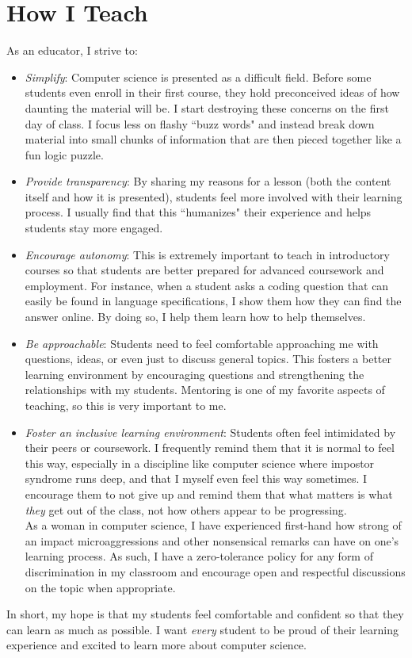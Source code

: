 \documentclass[12pt]{amsart} \usepackage{amssymb}
\begin{document}
\section*{How I Teach}
\noindent As an educator, I strive to:
\begin{itemize}
\item \emph{Simplify}: Computer science is presented as a difficult field. Before some students even enroll in their first course, they hold preconceived ideas of how daunting the material will be. I start destroying these concerns on the first day of class. I focus less on flashy ``buzz words" and instead break down material into small chunks of information that are then pieced together like a fun logic puzzle.
\vspace{2mm}
\item \emph{Provide transparency}: By sharing my reasons for a lesson (both the content itself and how it is presented), students feel more involved with their learning process. I usually find that this ``humanizes" their experience and helps students stay more engaged.
\vspace{2mm}
\item \emph{Encourage autonomy}: This is extremely important to teach in introductory courses so that students are better prepared for advanced coursework and employment. For instance, when a student asks a coding question that can easily be found in language specifications, I show them how they can find the answer online. By doing so, I help them learn how to help themselves.\vspace{2mm}
\item \emph{Be approachable}: Students need to feel comfortable approaching me with questions, ideas, or even just to discuss general topics. This fosters a better learning environment by encouraging questions and strengthening the relationships with my students. Mentoring is one of my favorite aspects of teaching, so this is very important to me.\vspace{2mm}
\item \emph{Foster an inclusive learning environment}: Students often feel intimidated by their peers or coursework. I frequently remind them that it is normal to feel this way, especially in a discipline like computer science where impostor syndrome runs deep, and that I myself even feel this way sometimes. I encourage them to not give up and remind them that what matters is what \emph{they} get out of the class, not how others appear to be progressing. \\As a woman in computer science, I have experienced first-hand how strong of an impact microaggressions and other nonsensical remarks can have on one's learning process. As such, I have a zero-tolerance policy for any form of discrimination in my classroom and encourage open and respectful discussions on the topic when appropriate. \vspace{2mm}
\end{itemize}
In short, my hope is that my students feel comfortable and confident so that they can learn as much as possible. I want \emph{every} student to be proud of their learning experience and excited to learn more about computer science.
\end{document}
